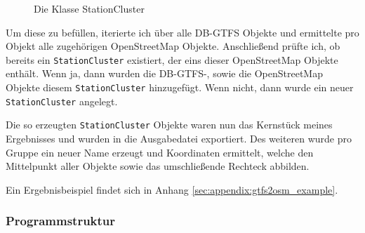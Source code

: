 \begin{figure}[htb]
   \centering
   \caption{Die Klasse StationCluster}
   \label{fig:gtfs2osm:stationcluster}
 \end{figure}

Um diese zu befüllen, iterierte ich über alle DB-GTFS Objekte und ermittelte pro Objekt alle zugehörigen OpenStreetMap Objekte.
Anschließend prüfte ich, ob bereits ein \texttt{StationCluster} existiert, der eins dieser OpenStreetMap Objekte enthält.
Wenn ja, dann wurden die DB-GTFS-, sowie die OpenStreetMap Objekte diesem \texttt{StationCluster} hinzugefügt.
Wenn nicht, dann wurde ein neuer \texttt{StationCluster} angelegt.

Die so erzeugten \texttt{StationCluster} Objekte waren nun das Kernstück meines Ergebnisses und wurden in die Ausgabedatei exportiert. Des weiteren wurde pro Gruppe ein neuer Name erzeugt und Koordinaten ermittelt, welche den Mittelpunkt aller Objekte sowie das umschließende Rechteck abbilden.

Ein Ergebnisbeispiel findet sich in Anhang \ref{sec:appendix:gtfs2osm_example}.

\subsubsection{Programmstruktur}

